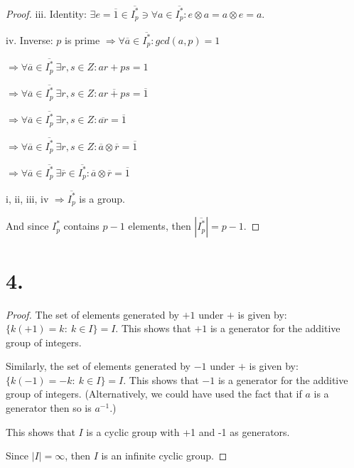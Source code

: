 \documentclass{article}
\begin{document}
\begin{proof}
\noindent
iii. Identity: $\exists e = \overline{1} \in \overline{I_p^*} \ni \forall a \in \overline{I_p^*}: e \otimes a = a \otimes e = a$.

\noindent
iv. Inverse: $p$ is prime $\Rightarrow \forall \overline{a} \in \overline{I_p^*}: gcd(a, p) = 1$

$\Rightarrow \forall \overline{a} \in \overline{I_p^*} \ \exists r,s \in Z: ar + ps = 1$ 

$\Rightarrow \forall \overline{a} \in \overline{I_p^*} \ \exists r,s \in Z: \overline{ar + ps} = \overline{1}$

$\Rightarrow \forall \overline{a} \in \overline{I_p^*} \ \exists r,s \in Z: \overline{ar} = \overline{1}$

$\Rightarrow \forall \overline{a} \in \overline{I_p^*} \ \exists r,s \in Z: \overline{a} \otimes \overline{r} = \overline{1} $

$\Rightarrow \forall \overline{a} \in \overline{I_p^*} \ \exists \overline{r} \in \overline{I_p^*}: \overline{a} \otimes \overline{r} = \overline{1}$
\newline

\noindent
i, ii, iii, iv $\Rightarrow \overline{I_p^*}$ is a group. 

\noindent
And since ${I_p^*}$ contains $p-1$ elements, then $|\overline{I_p^*}| = p-1$.
\newline
\end{proof}

\section*{4.}

\begin{proof}
  The set of elements generated by $+1$ under $+$ is given by: $\{k(+1) = k: \ k \in I\} = I$. This shows that $+1$ is a generator for the additive group of integers.
  \newline

  \noindent
  Similarly, the set of elements generated by $-1$ under $+$ is given by: $\{k(-1) = -k: \ k \in I\} = I$. This shows that $-1$ is a generator for the additive group of integers. (Alternatively, we could have used the fact that if $a$ is a generator then so is $a^{-1}$.)
  \newline

  \noindent
  This shows that $I$ is a cyclic group with  +1 and -1 as generators.
  \newline

  \noindent
  Since $|I| = \infty$, then $I$ is an infinite cyclic group.

\end{proof}
\end{document}
